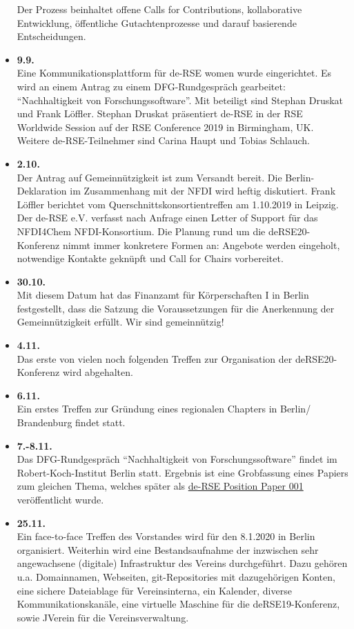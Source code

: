 \begin{itemize}
 Der Prozess beinhaltet offene Calls for Contributions, kollaborative Entwicklung, öffentliche Gutachtenprozesse und darauf basierende Entscheidungen.
 \item \textbf{9.9.}\\
 Eine Kommunikationsplattform für de-RSE women wurde eingerichtet.
 Es wird an einem Antrag zu einem DFG-Rundgespräch gearbeitet: "`Nachhaltigkeit von Forschungssoftware"'.
 Mit beteiligt sind Stephan Druskat und Frank Löffler.
 Stephan Druskat präsentiert de-RSE in der RSE Worldwide Session auf der RSE Conference 2019 in Birmingham, UK. 
 Weitere de-RSE-Teilnehmer sind Carina Haupt und Tobias Schlauch.
 \item \textbf{2.10.}\\
 Der Antrag auf Gemeinnützigkeit ist zum Versandt bereit. Die Berlin-Deklaration im Zusammenhang mit der NFDI wird heftig diskutiert. Frank Löffler berichtet vom Querschnittskonsortientreffen am 1.10.2019 in Leipzig. Der de-RSE e.V. verfasst nach Anfrage einen Letter of Support für das NFDI4Chem NFDI-Konsortium. Die Planung rund um die deRSE20-Konferenz nimmt immer konkretere Formen an: Angebote werden eingeholt, notwendige Kontakte geknüpft und Call for Chairs vorbereitet.

 \item \textbf{30.10.}\\
 Mit diesem Datum hat das Finanzamt für Körperschaften I in Berlin festgestellt, dass die Satzung die Voraussetzungen für die Anerkennung der Gemeinnützigkeit erfüllt. Wir sind gemeinnützig!

 \item \textbf{4.11.}\\
 Das erste von vielen noch folgenden Treffen zur Organisation der deRSE20-Konferenz wird abgehalten.

 \item \textbf{6.11.}\\
 Ein erstes Treffen zur Gründung eines regionalen Chapters in Berlin/ Brandenburg findet statt.

 \item \textbf{7.-8.11.}\\
 Das DFG-Rundgespräch "`Nachhaltigkeit von Forschungssoftware"' findet im Robert-Koch-Institut Berlin statt.
 Ergebnis ist eine Grobfassung eines Papiers zum gleichen Thema, welches später als \href{https://arxiv.org/pdf/2005.01469.pdf}{de-RSE Position Paper 001} veröffentlicht wurde.

 \item \textbf{25.11.}\\
 Ein face-to-face Treffen des Vorstandes wird für den 8.1.2020 in Berlin organisiert. Weiterhin wird eine Bestandsaufnahme der inzwischen sehr angewachsene (digitale) Infrastruktur des Vereins durchgeführt. Dazu gehören u.a. Domainnamen, Webseiten, git-Repositories mit dazugehörigen Konten, eine sichere Dateiablage für Vereinsinterna, ein Kalender, diverse Kommunikationskanäle, eine virtuelle Maschine für die deRSE19-Konferenz, sowie JVerein für die Vereinsverwaltung.


\end{itemize}
